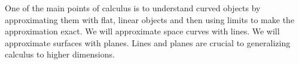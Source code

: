 One of the main points of calculus is to understand curved objects by
approximating them with flat, linear objects and then using limits to
make the approximation exact. We will approximate space curves with
lines. We will approximate surfaces with planes.  Lines and planes are
crucial to generalizing calculus to higher dimensions.











